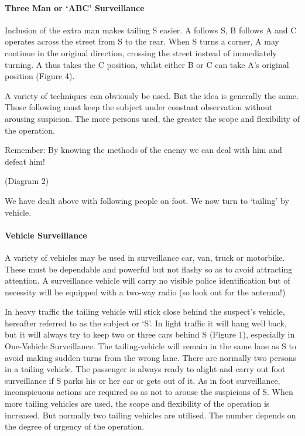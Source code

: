 \paragraph{Three Man or `ABC'
Surveillance}

Inclusion of the extra man makes tailing S easier. A follows S, B
follows A and C operates across the street from S to the rear. When S
turns a corner, A may continue in the original direction, crossing the
street instead of immediately turning. A thus takes the C position,
whilst either B or C can take A's original position (Figure 4).

A variety of techniques can obviously be used. But the idea is generally
the same. Those following must keep the subject under constant
observation without arousing suspicion. The more persons used, the
greater the scope and flexibility of the operation.

Remember: By knowing the methods of the enemy we can deal with him and
defeat him!

(Diagram 2)

We have dealt above with following people on foot. We now turn to
`tailing' by vehicle.

\paragraph{Vehicle Surveillance}

A variety of vehicles may be used in surveillance car, van, truck or
motorbike. These must be dependable and powerful but not flashy so as to
avoid attracting attention. A surveillance vehicle will carry no visible
police identification but of necessity will be equipped with a two-way
radio (so look out for the antenna!)

In heavy traffic the tailing vehicle will stick close behind the
suspect's vehicle, hereafter referred to as the subject or `S'. In light
traffic it will hang well back, but it will always try to keep two or
three cars behind S (Figure 1), especially in One-Vehicle Surveillance.
The tailing-vehicle will remain in the same lane as S to avoid making
sudden turns from the wrong lane. There are normally two persons in a
tailing vehicle. The passenger is always ready to alight and carry out
foot surveillance if S parks his or her car or gets out of it. As in
foot surveillance, inconspicuous actions are required so as not to
arouse the suspicions of S. When more tailing vehicles are used, the
scope and flexibility of the operation is increased. But normally two
tailing vehicles are utilised. The number depends on the degree of
urgency of the operation.

